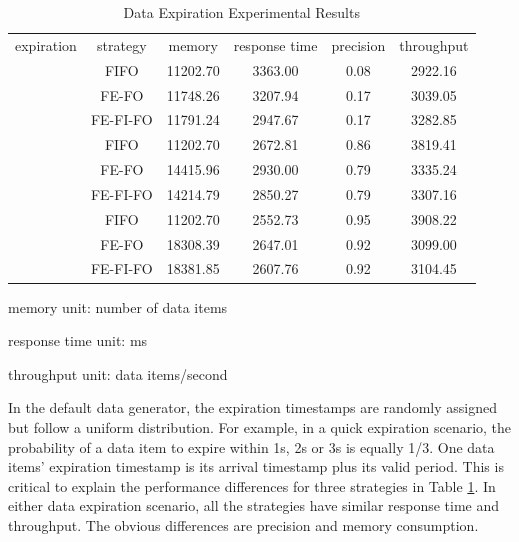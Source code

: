 \begin{table}[!htbp]
\centering
\caption{Data Expiration Experimental Results}
\label{tab:6-dei}
\begin{tabular}{|c||c||c|c|c|c|}
\hline
expiration & strategy & memory & response time & precision & throughput \\ \hhline{|=#=#=|=|=|=|}
\multirow{3}{*}{quick} & FIFO & 11202.70 & 3363.00 & 0.08 & 2922.16 \\ \cline{2-6} 
 					  & FE-FO & 11748.26 & 3207.94 & 0.17 & 3039.05 \\ \cline{2-6} 
 					  & FE-FI-FO & 11791.24 & 2947.67 & 0.17 & 3282.85 \\ \hhline{|=#=#=|=|=|=|}
\multirow{3}{*}{normal} & FIFO & 11202.70 & 2672.81 & 0.86 & 3819.41 \\ \cline{2-6} 
 						& FE-FO & 14415.96 & 2930.00 & 0.79 & 3335.24 \\ \cline{2-6} 
 						& FE-FI-FO & 14214.79 & 2850.27 & 0.79 & 3307.16 \\ \hhline{|=#=#=|=|=|=|}
\multirow{3}{*}{slow} & FIFO & 11202.70 & 2552.73 & 0.95 & 3908.22\\ \cline{2-6} 
					  & FE-FO & 18308.39 & 2647.01 & 0.92 & 3099.00 \\ \cline{2-6} 
 					  & FE-FI-FO & 18381.85 & 2607.76 & 0.92 & 3104.45 \\ \hline
\end{tabular}
	\begin{tablenotes}
 		\item memory unit: number of data items
 		\item response time unit: ms
 		\item throughput unit: data items/second
    \end{tablenotes}
\end{table}

In the default data generator, the expiration timestamps are randomly assigned but follow a uniform distribution.
For example, in a quick expiration scenario, the probability of a data item to expire within 1s, 2s or 3s is equally 1/3.
One data items' expiration timestamp is its arrival timestamp plus its valid period.
This is critical to explain the performance differences for three strategies in Table \ref{tab:6-dei}.
In either data expiration scenario, all the strategies have similar response time and throughput. 
The obvious differences are precision and memory consumption. 

